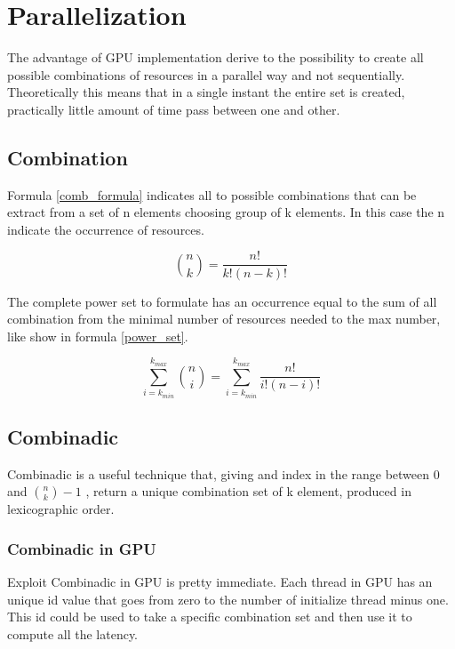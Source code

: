 \chapter{Parallelization}
\label{chap2}

The advantage of GPU implementation derive to the possibility to create all possible combinations of resources in a parallel way and not sequentially. Theoretically this means that in a single instant the entire set is created, practically little amount of time pass between one and other.

\section{Combination}

Formula \ref{comb_formula} indicates all to possible combinations that can be extract from a set of n elements choosing group of k elements. In this case the n indicate the occurrence of resources. 

\begin{equation}
    \binom{n}{k} = \frac{n!}{k!(n-k)!}
    \label{comb_formula}
\end{equation}

The complete power set to formulate has an occurrence equal to the sum of all combination from the minimal number of resources needed to the max number, like show in formula \ref{power_set}.

\begin{equation}
    \sum_{i=k_{min}}^{k_{max}} \binom{n}{i} = 
    \sum_{i=k_{min}}^{k_{max}} \frac{n!}{i!(n-i)!}
    \label{power_set}
\end{equation}

\section{Combinadic}

Combinadic is a useful technique that, giving and index in the range between 0 and $\binom{n}{k}-1$ , return a unique combination set of k element, produced in lexicographic order.

\subsection{Combinadic in GPU}

Exploit Combinadic in GPU is pretty immediate. Each thread in GPU has an unique id value that goes from zero to the number of initialize thread minus one. This id could be used to take a specific combination set and then use it to compute all the latency. 

